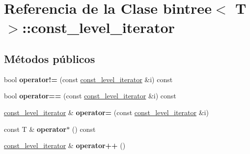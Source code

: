 \hypertarget{classbintree_1_1const__level__iterator}{}\section{Referencia de la Clase bintree$<$ T $>$\+:\+:const\+\_\+level\+\_\+iterator}
\label{classbintree_1_1const__level__iterator}
\subsection*{Métodos públicos}
\begin{DoxyCompactItemize}
\item 
bool {\bfseries operator!=} (const \hyperlink{classbintree_1_1const__level__iterator}{const\+\_\+level\+\_\+iterator} \&i) const \hypertarget{classbintree_1_1const__level__iterator_a0d79bc90b834462af5747141eba37435}{}\label{classbintree_1_1const__level__iterator_a0d79bc90b834462af5747141eba37435}

\item 
bool {\bfseries operator==} (const \hyperlink{classbintree_1_1const__level__iterator}{const\+\_\+level\+\_\+iterator} \&i) const \hypertarget{classbintree_1_1const__level__iterator_a803adc590ceaa61f12a0e2da37020591}{}\label{classbintree_1_1const__level__iterator_a803adc590ceaa61f12a0e2da37020591}

\item 
\hyperlink{classbintree_1_1const__level__iterator}{const\+\_\+level\+\_\+iterator} \& {\bfseries operator=} (const \hyperlink{classbintree_1_1const__level__iterator}{const\+\_\+level\+\_\+iterator} \&i)\hypertarget{classbintree_1_1const__level__iterator_aeb952e9cda23245fe3127ecdace152a8}{}\label{classbintree_1_1const__level__iterator_aeb952e9cda23245fe3127ecdace152a8}

\item 
const T \& {\bfseries operator$\ast$} () const \hypertarget{classbintree_1_1const__level__iterator_ac5aae2df8b0f420d3ad6d14f1c3e23b6}{}\label{classbintree_1_1const__level__iterator_ac5aae2df8b0f420d3ad6d14f1c3e23b6}

\item 
\hyperlink{classbintree_1_1const__level__iterator}{const\+\_\+level\+\_\+iterator} \& {\bfseries operator++} ()\hypertarget{classbintree_1_1const__level__iterator_a93e8545a61c8081e3b08307ac1d31c3a}{}\label{classbintree_1_1const__level__iterator_a93e8545a61c8081e3b08307ac1d31c3a}

\end{DoxyCompactItemize}
